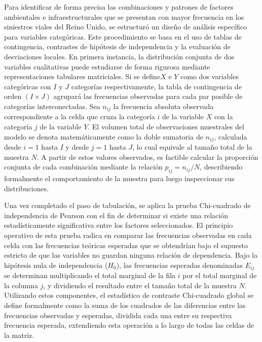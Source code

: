 \documentclass[12pt]{article}
\begin{document}
Para identificar de forma precisa las combinaciones y patrones de factores ambientales e infraestructurales que se presentan con mayor frecuencia en los siniestros viales del Reino Unido, se estructuró un diseño de análisis específico para variables categóricas. Este procedimiento se basa en el uso de tablas de contingencia, contrastes de hipótesis de independencia y la evaluación de desviaciones locales. En primera instancia, la distribución conjunta de dos variables cualitativas puede estudiarse de forma rigurosa mediante representaciones tabulares matriciales. Si se define$X$ e $Y$ como dos variables categóricas con $I$ y $J$ categorías respectivamente, la tabla de contingencia de orden $(I \times J)$ agrupará las frecuencias observadas para cada par posible de categorías interconectadas. Sea $n_{ij}$ la frecuencia absoluta observada correspondiente a la celda que cruza la categoría $i$ de la variable $X$ con la categoría $j$ de la variable $Y$. El volumen total de observaciones muestrales del modelo se denota matemáticamente como la doble sumatoria de $n_{ij}$, calculada desde $i=1$ hasta $I$ y desde $j=1$ hasta $J$, lo cual equivale al tamaño total de la muestra $N$. A partir de estos valores observados, es factible calcular la proporción conjunta de cada combinación mediante la relación $p_{ij} = n_{ij} / N$, describiendo formalmente el comportamiento de la muestra para luego inspeccionar sus distribuciones.

Una vez completado el paso de tabulación, se aplica la prueba Chi-cuadrado de independencia de Pearson con el fin de determinar si existe una relación estadísticamente significativa entre los factores seleccionados. El principio operativo de esta prueba radica en comparar las frecuencias observadas en cada celda con las frecuencias teóricas esperadas que se obtendrían bajo el supuesto estricto de que las variables no guardan ninguna relación de dependencia. Bajo la hipótesis nula de independencia ($H_0$), las frecuencias esperadas denominadas $E_{ij}$ se determinan multiplicando el total marginal de la fila $i$ por el total marginal de la columna $j$, y dividiendo el resultado entre el tamaño total de la muestra $N$. Utilizando estos componentes, el estadístico de contraste Chi-cuadrado global se define formalmente como la suma de los cuadrados de las diferencias entre las frecuencias observadas y esperadas, dividida cada una entre su respectiva frecuencia esperada, extendiendo esta operación a lo largo de todas las celdas de la matriz.
\end{document}
